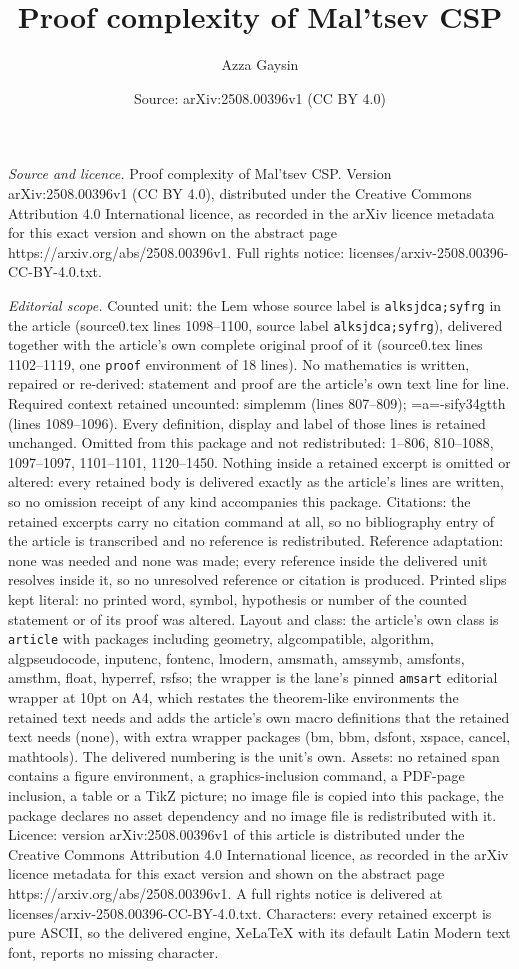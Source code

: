 \documentclass[10pt,a4paper]{amsart}
\title[Proof complexity of Mal'tsev CSP]{Proof complexity of Mal'tsev CSP}
\author{Azza Gaysin}
\date{Source: arXiv:2508.00396v1 (CC BY 4.0)}
\begin{document}
\maketitle

\noindent\emph{Source and licence.} Proof complexity of Mal'tsev CSP. Version arXiv:2508.00396v1 (CC BY 4.0), distributed under the Creative Commons Attribution 4.0 International licence, as recorded in the arXiv licence metadata for this exact version and shown on the abstract page https://arxiv.org/abs/2508.00396v1. Full rights notice: licenses/arxiv-2508.00396-CC-BY-4.0.txt.\par\smallskip

\noindent\textit{Editorial scope.} Counted unit: the Lem whose source label is \texttt{alksjdca;syfrg} in the article (source0.tex lines 1098--1100, source label \texttt{alksjdca;syfrg}), delivered together with the article's own complete original proof of it (source0.tex lines 1102--1119, one \texttt{proof} environment of 18 lines). No mathematics is written, repaired or re-derived: statement and proof are the article's own text line for line. Required context retained uncounted: simplemm (lines 807--809); =a=-sify34gtth (lines 1089--1096). Every definition, display and label of those lines is retained unchanged. Omitted from this package and not redistributed: 1--806, 810--1088, 1097--1097, 1101--1101, 1120--1450. Nothing inside a retained excerpt is omitted or altered: every retained body is delivered exactly as the article's lines are written, so no omission receipt of any kind accompanies this package. Citations: the retained excerpts carry no citation command at all, so no bibliography entry of the article is transcribed and no reference is redistributed. Reference adaptation: none was needed and none was made; every reference inside the delivered unit resolves inside it, so no unresolved reference or citation is produced. Printed slips kept literal: no printed word, symbol, hypothesis or number of the counted statement or of its proof was altered. Layout and class: the article's own class is \texttt{article} with packages including geometry, algcompatible, algorithm, algpseudocode, inputenc, fontenc, lmodern, amsmath, amssymb, amsfonts, amsthm, float, hyperref, rsfso; the wrapper is the lane's pinned \texttt{amsart} editorial wrapper at 10pt on A4, which restates the theorem-like environments the retained text needs and adds the article's own macro definitions that the retained text needs (none), with extra wrapper packages (bm, bbm, dsfont, xspace, cancel, mathtools). The delivered numbering is the unit's own. Assets: no retained span contains a figure environment, a graphics-inclusion command, a PDF-page inclusion, a table or a TikZ picture; no image file is copied into this package, the package declares no asset dependency and no image file is redistributed with it. Licence: version arXiv:2508.00396v1 of this article is distributed under the Creative Commons Attribution 4.0 International licence, as recorded in the arXiv licence metadata for this exact version and shown on the abstract page https://arxiv.org/abs/2508.00396v1. A full rights notice is delivered at licenses/arxiv-2508.00396-CC-BY-4.0.txt. Characters: every retained excerpt is pure ASCII, so the delivered engine, XeLaTeX with its default Latin Modern text font, reports no missing character.
\end{document}
